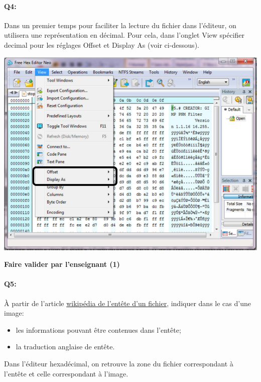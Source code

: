 \documentclass{article}
\begin{document}
\paragraph{Q4:}
Dans un premier temps pour faciliter la lecture du fichier dans l'éditeur, on utilisera une représentation en décimal. 
Pour cela, dans l'onglet \og{}View\fg{} spécifier \og{}decimal\fg{} pour les réglages \og{}Offset\fg{} et \og{}Display As\fg{} (voir ci-dessous).

\begin{center}
	\includegraphics[width=.6\linewidth]{./figures/config_decimal.png}
\end{center}

\begin{center}
	\vspace{2em}
	\Large
	\textbf{Faire valider par l'enseignant (1)}
\end{center}

\newpage

\paragraph{Q5:}
À partir de l'article \href{https://fr.wikipedia.org/wiki/Header}{wikipédia de l'entête d’un fichier}, indiquer dans le cas d'une image:
\begin{itemize}
	\item les informations pouvant être contenues dans l'entête;
	\item la traduction anglaise de \og{}entête\fg{}.
\end{itemize}

\vspace{1em}
\begin{Form}
	\TextField[name=r5,width=\linewidth,height=5em,multiline=true]{}
\end{Form}

Dans l'éditeur hexadécimal, on retrouve la zone du fichier correspondant à l'entête et celle correspondant à l'image.\\
\end{document}
